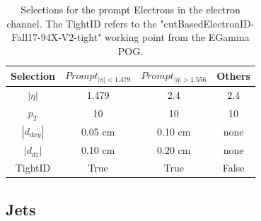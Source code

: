 \documentclass{cernatlasnote}
\begin{document}
    \begin{table}[h]
\centering
\begin{tabular}{|c|c|c|c|}
  \hline
  \rowcolor{lightgray} 
  Selection & $Prompt_{|\eta|<1.479}$ & $Prompt_{|\eta|> 1.556}$ & Others \\
  \hline
  $|\eta|$ & 1.479 & 2.4 & 2.4 \\
  $p_T$ & 10 & 10 & 10\\
  $|d_{dxy}|$ & 0.05 cm  & 0.10 cm & none\\
  $|d_{dz}|$ & 0.10 cm & 0.20 cm & none\\
  TightID & True & True & False\\
  \hline
\end{tabular}
    \caption{Selections for the prompt Electrons in the electron channel. The TightID refers to the "cutBasedElectronID-Fall17-94X-V2-tight" working point from the EGamma POG.}
    \label{tab:ELSEL}
\end{table}



    \subsection{Jets}
        \label{SUB:JETS}
\end{document}
